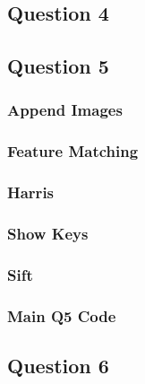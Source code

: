 	\subsection{Question 4}
	\pagebreak
	
	\subsection{Question 5}
		\subsubsection{Append Images}
		
		\pagebreak
		\subsubsection{Feature Matching}
		
		\pagebreak
		\subsubsection{Harris}
		
		\pagebreak
		\subsubsection{Show Keys}
		
		\pagebreak
		\subsubsection{Sift}
		
		\pagebreak
		\subsubsection{Main Q5 Code}
		
		\pagebreak
	
	\subsection{Question 6}
	\pagebreak
		